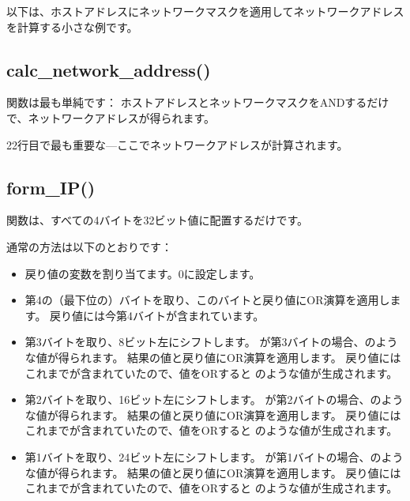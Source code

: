 以下は、ホストアドレスにネットワークマスクを適用してネットワークアドレスを計算する小さな例です。



\subsection{calc\_network\_address()}

関数は最も単純です：
ホストアドレスとネットワークマスクをANDするだけで、ネットワークアドレスが得られます。



22行目で最も重要な---ここでネットワークアドレスが計算されます。

\subsection{form\_IP()}

関数は、すべての4バイトを32ビット値に配置するだけです。

通常の方法は以下のとおりです：

\begin{itemize}
\item 戻り値の変数を割り当てます。0に設定します。

\item 第4の（最下位の）バイトを取り、このバイトと戻り値にOR演算を適用します。
戻り値には今第4バイトが含まれています。

\item 第3バイトを取り、8ビット左にシフトします。
が第3バイトの場合、のような値が得られます。
結果の値と戻り値にOR演算を適用します。
戻り値にはこれまでが含まれていたので、値をORすると
のような値が生成されます。

\item 第2バイトを取り、16ビット左にシフトします。
が第2バイトの場合、のような値が得られます。
結果の値と戻り値にOR演算を適用します。
戻り値にはこれまでが含まれていたので、値をORすると
のような値が生成されます。

\item 第1バイトを取り、24ビット左にシフトします。
が第1バイトの場合、のような値が得られます。
結果の値と戻り値にOR演算を適用します。
戻り値にはこれまでが含まれていたので、値をORすると
のような値が生成されます。

\end{itemize}

